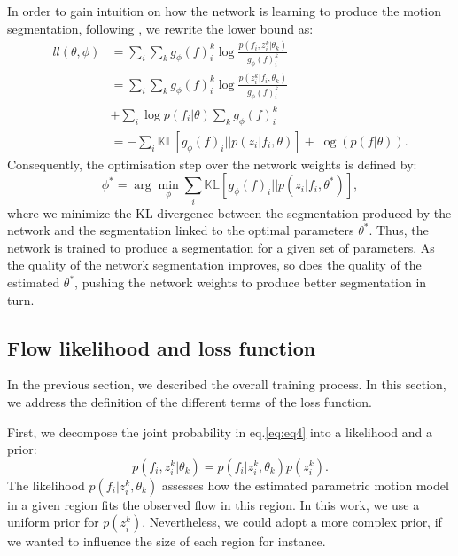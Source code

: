 \documentclass[10pt,twocolumn,letterpaper]{article}
\begin{document}
In order to gain intuition on how the network is learning to produce the motion segmentation, following \cite{murphy_book2012}, we rewrite the lower bound as:
\begin{align}
ll(\theta, \phi) &= \sum_i\sum_k g_\phi(f)_i^k \log \frac{p(f_i, z_i^k | \theta_k)}{g_\phi(f)_i^k} \nonumber\\
&=\sum_i\sum_k g_\phi(f)_i^k \log \frac{p(z_i^k | f_i, \theta_k)}{g_\phi(f)_i^k} \nonumber\\
&+ \sum_i \log p(f_i | \theta) \sum_k g_\phi(f)_i^k \nonumber\\
&= - \sum_i \mathbb{KL}[g_\phi(f)_i || p(z_i|f_i, \theta)] + \log(p(f|\theta)).
\end{align}
Consequently, the optimisation step over the network weights is defined by: 
\begin{equation}
\phi^* = \arg \min_{\phi} \sum_i \mathbb{KL}[g_\phi(f)_i || p(z_i|f_i, \theta^*)],
\end{equation}
where we minimize the KL-divergence between the segmentation produced by the network and the segmentation linked to the optimal parameters $\theta^*$. Thus, the network is trained to produce a segmentation for a given set of parameters. As the quality of the network segmentation improves, so does the quality of the estimated $\theta^*$, pushing the network weights to produce better segmentation in turn.




\subsection{Flow likelihood and loss function}
\label{sec:dataterm}

In the previous section, we described the overall training process. In this section, we address the definition of the different terms of the loss function. 

First, we decompose the joint probability in eq.\eqref{eq:eq4} into a likelihood and a prior:
\begin{equation}
\label{eq:eq9}
    p(f_i, z_i^k| \theta_k) = p(f_i | z_i^k, \theta_k)p(z_i^k).
\end{equation}
The likelihood $p(f_i | z_i^k, \theta_k)$ assesses how the estimated parametric motion model in a given region fits the observed flow in this region. In this work, we use a uniform prior for $p(z_i^k)$. Nevertheless, we could adopt a more complex prior, if we wanted to influence the size of each region for instance.
\end{document}
